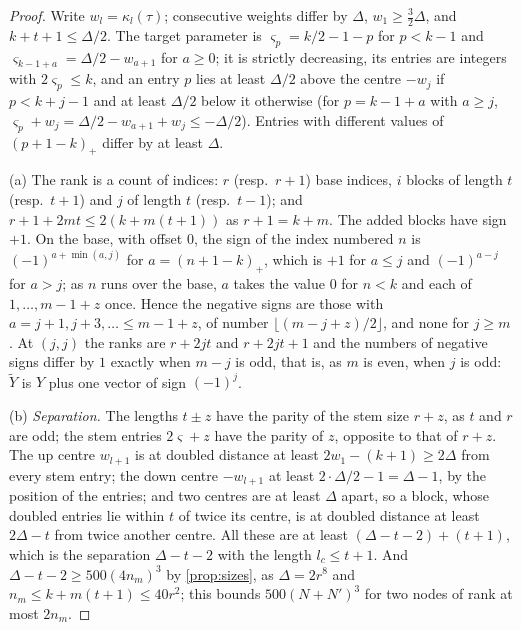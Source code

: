 \begin{proof}
Write $w_l=\kappa_l(\tau)$; consecutive weights differ by $\Delta$, $w_1\ge\frac32\Delta$, and $k+t+1\le\Delta/2$. The target parameter is $\varsigma_p=k/2-1-p$ for $p<k-1$ and $\varsigma_{k-1+a}=\Delta/2-w_{a+1}$ for $a\ge0$; it is strictly decreasing, its entries are integers with $2\varsigma_p\le k$, and an entry $p$ lies at least $\Delta/2$ above the centre $-w_j$
if $p<k+j-1$ and at least $\Delta/2$ below it otherwise (for $p=k-1+a$ with $a\ge j$, $\varsigma_p+w_j=\Delta/2-w_{a+1}+w_j\le-\Delta/2$). Entries with different values of $(p+1-k)_+$ differ by at least $\Delta$.

(a) The rank is a count of indices: $r$ (resp.\ $r+1$) base indices, $i$ blocks of length $t$ (resp.\ $t+1$) and $j$ of length $t$ (resp.\ $t-1$); and $r+1+2mt\le2(k+m(t+1))$ as $r+1=k+m$. The added blocks have sign $+1$. On the base, with offset $0$, the sign of the index numbered $n$ is $(-1)^{a+\min(a,j)}$ for $a=(n+1-k)_+$, which is $+1$
for $a\le j$ and $(-1)^{a-j}$ for $a>j$; as $n$ runs over the base, $a$ takes the value $0$ for $n<k$ and each of $1,\dots,m-1+z$ once. Hence the negative signs are those with $a=j+1,j+3,\dots\le m-1+z$, of number $\lfloor(m-j+z)/2\rfloor$, and none for $j\ge m$. At $(j,j)$ the ranks are $r+2jt$ and $r+2jt+1$ and the
numbers of negative signs differ by $1$ exactly when $m-j$ is odd, that is, as $m$ is even, when $j$ is odd: $\tilde Y$ is $Y$ plus one vector of sign $(-1)^j$.

(b) \emph{Separation.} The lengths $t\pm z$ have the parity of the stem size $r+z$, as $t$ and $r$ are odd; the stem entries $2\varsigma+z$ have the parity of $z$, opposite to that of $r+z$. The up centre $w_{l+1}$ is at doubled distance at least $2w_1-(k+1)\ge2\Delta$ from every stem entry; the down centre $-w_{l+1}$ at least
$2\cdot\Delta/2-1=\Delta-1$, by the position of the entries; and two centres are at least $\Delta$ apart, so a block, whose doubled entries lie within $t$ of twice its centre, is at doubled distance at least $2\Delta-t$ from twice another centre. All these are at least $(\Delta-t-2)+(t+1)$, which is the separation
$\Delta-t-2$ with the length $l_c\le t+1$. And $\Delta-t-2\ge500(4n_m)^3$ by \cref{prop:sizes}, as $\Delta=2r^8$ and $n_m\le k+m(t+1)\le40r^2$; this bounds $500(N+N')^3$ for two nodes of rank at most $2n_m$.


\end{proof}
